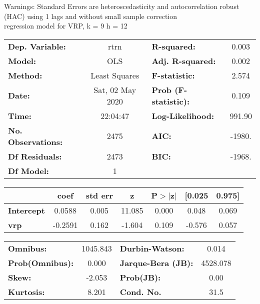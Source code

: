 Warnings: \newline
 [1] Standard Errors are heteroscedasticity and autocorrelation robust (HAC) using 1 lags and without small sample correction\\ 

regression model for VRP, k = 9 h = 12\begin{center}
\begin{tabular}{lclc}
\toprule
\textbf{Dep. Variable:}    &       rtrn       & \textbf{  R-squared:         } &     0.003   \\
\textbf{Model:}            &       OLS        & \textbf{  Adj. R-squared:    } &     0.002   \\
\textbf{Method:}           &  Least Squares   & \textbf{  F-statistic:       } &     2.574   \\
\textbf{Date:}             & Sat, 02 May 2020 & \textbf{  Prob (F-statistic):} &    0.109    \\
\textbf{Time:}             &     22:04:47     & \textbf{  Log-Likelihood:    } &    991.90   \\
\textbf{No. Observations:} &        2475      & \textbf{  AIC:               } &    -1980.   \\
\textbf{Df Residuals:}     &        2473      & \textbf{  BIC:               } &    -1968.   \\
\textbf{Df Model:}         &           1      & \textbf{                     } &             \\
\bottomrule
\end{tabular}
\begin{tabular}{lcccccc}
                   & \textbf{coef} & \textbf{std err} & \textbf{z} & \textbf{P$> |$z$|$} & \textbf{[0.025} & \textbf{0.975]}  \\
\midrule
\textbf{Intercept} &       0.0588  &        0.005     &    11.085  &         0.000        &        0.048    &        0.069     \\
\textbf{vrp}       &      -0.2591  &        0.162     &    -1.604  &         0.109        &       -0.576    &        0.057     \\
\bottomrule
\end{tabular}
\begin{tabular}{lclc}
\textbf{Omnibus:}       & 1045.843 & \textbf{  Durbin-Watson:     } &    0.014  \\
\textbf{Prob(Omnibus):} &   0.000  & \textbf{  Jarque-Bera (JB):  } & 4528.078  \\
\textbf{Skew:}          &  -2.053  & \textbf{  Prob(JB):          } &     0.00  \\
\textbf{Kurtosis:}      &   8.201  & \textbf{  Cond. No.          } &     31.5  \\
\bottomrule
\end{tabular}
\end{center}

